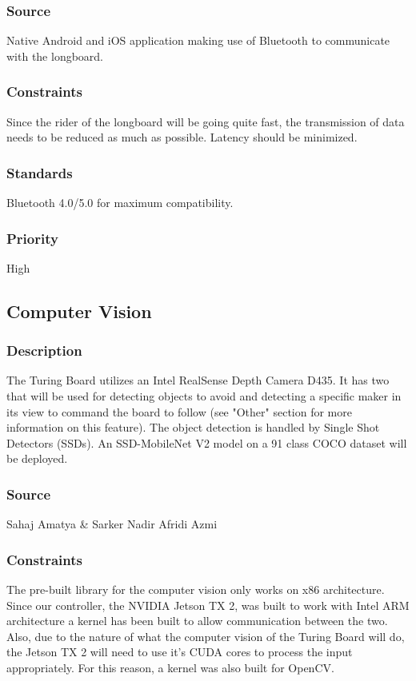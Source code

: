 \subsubsection{Source}
Native Android and iOS application making use of Bluetooth to communicate with the longboard.
\subsubsection{Constraints}
Since the rider of the longboard will be going quite fast, the transmission of data needs to be reduced as much as possible. Latency should be minimized.
\subsubsection{Standards}
Bluetooth 4.0/5.0 for maximum compatibility.
\subsubsection{Priority}
High

\subsection{Computer Vision}
\subsubsection{Description}
The Turing Board utilizes an Intel RealSense Depth Camera D435. It has two that will be used for detecting objects to avoid and detecting a specific maker in its view to command the board to follow (see "Other" section for more information on this feature). The object detection is handled by Single Shot Detectors (SSDs). An SSD-MobileNet V2 model on a 91 class COCO dataset will be deployed.
\subsubsection{Source}
Sahaj Amatya & Sarker Nadir Afridi Azmi
\subsubsection{Constraints}
The pre-built library for the computer vision only works on x86 architecture. Since our controller, the NVIDIA Jetson TX 2, was built to work with Intel ARM architecture a kernel has been built to allow communication between the two.
Also, due to the nature of what the computer vision of the Turing Board will do, the Jetson TX 2 will need to use it's CUDA cores to process the input appropriately. For this reason, a kernel was also built for OpenCV.
